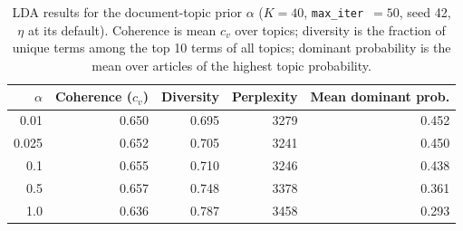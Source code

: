 \begin{table}[ht]
\centering
\caption{LDA results for the document-topic prior $\alpha$ ($K=40$, \texttt{max\_iter}~$=50$, seed 42, $\eta$ at its default). Coherence is mean $c_v$ over topics; diversity is the fraction of unique terms among the top 10 terms of all topics; dominant probability is the mean over articles of the highest topic probability.}
\label{tab:alpha}
\begin{tabular}{rrrrr}
\hline
$\alpha$ & Coherence ($c_v$) & Diversity & Perplexity & Mean dominant prob. \\
\hline
0.01  & 0.650 & 0.695 & 3279 & 0.452 \\
0.025 & 0.652 & 0.705 & 3241 & 0.450 \\
0.1   & 0.655 & 0.710 & 3246 & 0.438 \\
0.5   & 0.657 & 0.748 & 3378 & 0.361 \\
1.0   & 0.636 & 0.787 & 3458 & 0.293 \\
\hline
\end{tabular}
\end{table}
